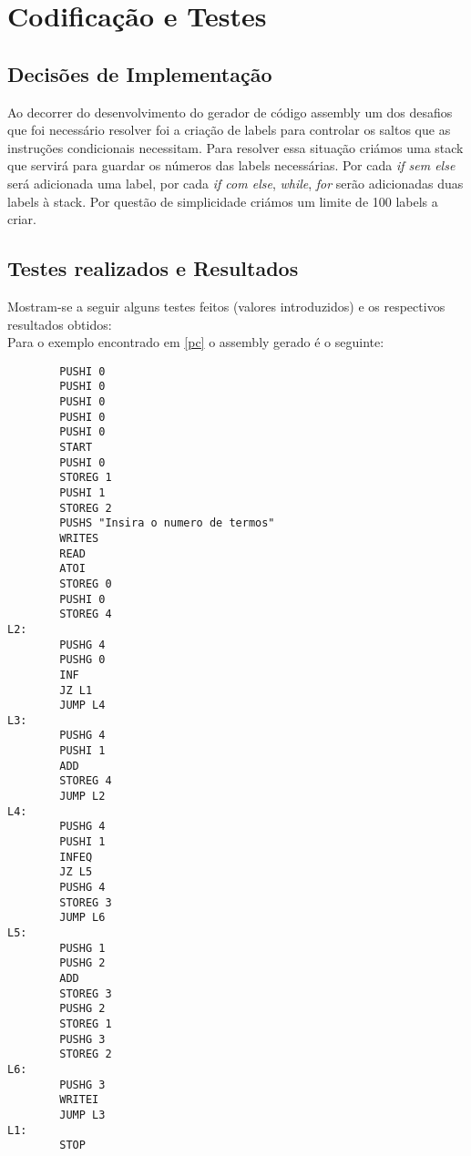 \documentclass{report}
\begin{document}
\chapter{Codificação e Testes} \label {code}
\section{Decisões de Implementação}
Ao decorrer do desenvolvimento do gerador de código assembly um dos desafios que foi necessário resolver foi a criação de labels para controlar os saltos que as instruções condicionais necessitam. Para resolver essa situação criámos uma stack que servirá para guardar os números das labels necessárias. Por cada \emph{if sem else} será adicionada uma label, por cada \emph{if com else}, \emph{while}, \emph{for} serão adicionadas duas labels à stack. Por questão de simplicidade criámos um limite de 100 labels a criar.
\section{Testes realizados e Resultados}
Mostram-se a seguir alguns testes feitos (valores introduzidos) e
os respectivos resultados obtidos:\\
Para o exemplo encontrado em \ref{pc} o assembly gerado é o seguinte:
\begin{verbatim}
        PUSHI 0
        PUSHI 0
        PUSHI 0
        PUSHI 0
        PUSHI 0
        START
        PUSHI 0
        STOREG 1
        PUSHI 1
        STOREG 2
        PUSHS "Insira o numero de termos"
        WRITES
        READ
        ATOI
        STOREG 0
        PUSHI 0
        STOREG 4
L2:
        PUSHG 4
        PUSHG 0
        INF
        JZ L1
        JUMP L4
L3:
        PUSHG 4
        PUSHI 1
        ADD
        STOREG 4
        JUMP L2
L4:
        PUSHG 4
        PUSHI 1
        INFEQ
        JZ L5
        PUSHG 4
        STOREG 3
        JUMP L6
L5:
        PUSHG 1
        PUSHG 2
        ADD
        STOREG 3
        PUSHG 2
        STOREG 1
        PUSHG 3
        STOREG 2
L6:
        PUSHG 3
        WRITEI
        JUMP L3
L1:
        STOP
\end{verbatim}
\end{document}

